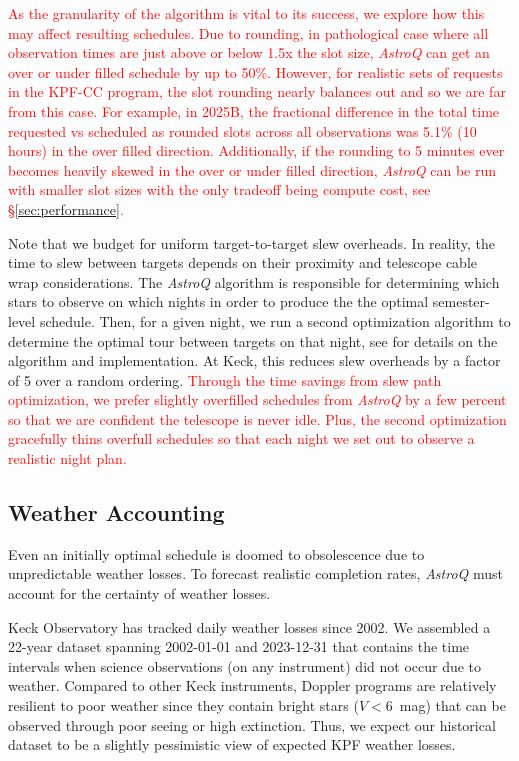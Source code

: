 \documentclass[twocolumn,linenumbers]{aastex63}
\newcommand{\red}[1]{\textcolor{red}{#1}}
\newcommand{\AstroQ}{\textit{AstroQ}\xspace}
\begin{document}
\red{As the granularity of the algorithm is vital to its success, we explore how this may affect resulting schedules. Due to rounding, in pathological case where all observation times are just above or below 1.5x the slot size, \AstroQ can get an over or under filled schedule by up to 50\%. However, for realistic sets of requests in the KPF-CC program, the slot rounding nearly balances out and so we are far from this case. For example, in 2025B, the fractional difference in the total time requested vs scheduled as rounded slots across all observations was 5.1\% (10 hours) in the over filled direction. Additionally, if the rounding to 5 minutes ever becomes heavily skewed in the over or under filled direction, \AstroQ can be run with smaller slot sizes with the only tradeoff being compute cost, see \S\ref{sec:performance}.}

Note that we budget for uniform target-to-target slew overheads. In reality, the time to slew between targets depends on their proximity and telescope cable wrap considerations. The \AstroQ algorithm is responsible for determining which stars to observe on which nights in order to produce the the optimal semester-level schedule. Then, for a given night, we run a second optimization algorithm to determine the optimal tour between targets on that night, see \cite{Handley2024_TTP} for details on the algorithm and implementation. At Keck, this reduces slew overheads by a factor of 5 over a random ordering. \red{Through the time savings from slew path optimization, we prefer slightly overfilled schedules from \AstroQ by a few percent so that we are confident the telescope is never idle. Plus, the second optimization gracefully thins overfull schedules so that each night we set out to observe a realistic night plan.}

\subsection{Weather Accounting}
\label{Weather}

Even an initially optimal schedule is doomed to obsolescence due to unpredictable weather losses. To forecast realistic completion rates, \AstroQ must account for the certainty of weather losses.


Keck Observatory has tracked daily weather losses since 2002. We assembled a 22-year dataset spanning 2002-01-01 and 2023-12-31 that contains the time intervals when science observations (on any instrument) did not occur due to weather. Compared to other Keck instruments, Doppler programs are relatively resilient to poor weather since they contain bright stars ($V < 6$~mag) that can be observed through poor seeing or high extinction. Thus, we expect our historical dataset to be a slightly pessimistic view of expected KPF weather losses.
\end{document}
